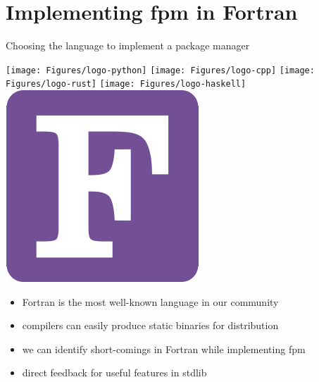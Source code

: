 \documentclass[lualatex,10pt,aspectratio=169]{beamer}
\begin{document}
\section{Implementing fpm in Fortran}

\begin{frame}{Choosing the language to implement a package manager}
   \medskip

   \begin{center}
      \texttt{[image: Figures/logo-python]}
      \quad
      \texttt{[image: Figures/logo-cpp]}
      \quad
      \texttt{[image: Figures/logo-rust]}
      \quad
      \texttt{[image: Figures/logo-haskell]}
      \quad
      \includegraphics[height=.5in]{Figures/logo-fortran}
   \end{center}
   \medskip

   \begin{itemize}
      \item \alert{Fortran} is the most well-known language in our community
      \item compilers can easily produce \alert{static binaries} for distribution
      \item we can identify short-comings in Fortran while implementing fpm
      \item direct feedback for useful features in \alert{stdlib}
   \end{itemize}
\end{frame}
\end{document}
